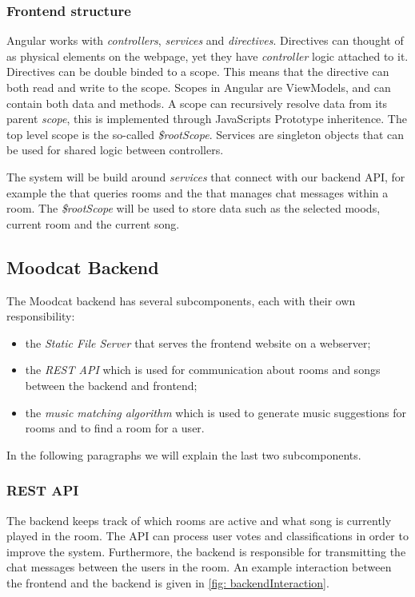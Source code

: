 \label{frontendstructure}
\subsubsection{Frontend structure}
Angular works with \textit{controllers}, \textit{services} and \textit{directives}.
Directives can thought of as physical elements on the webpage, yet they have \textit{controller} logic attached to it.
Directives can be double binded to a scope. This means that the directive can both read and write to the scope.
Scopes in Angular are \glspl{ViewModel}, and can contain both data and methods.
A scope can recursively resolve data from its parent \textit{scope}, this is implemented through JavaScripts \gls{Prototype inheritence}.
The top level scope is the so-called \textit{\$rootScope}.
Services are singleton objects that can be used for shared logic between controllers.

\par
The system will be build around \textit{services} that connect with our backend API, for example the  that queries rooms and the  that manages chat messages within a room.
The \textit{\$rootScope} will be used to store data such as the selected moods, current room and the current song.

\subsection{Moodcat Backend}
The Moodcat backend has several subcomponents, each with their own responsibility:
\begin{itemize}
\item the \textit{Static File Server} that serves the frontend website on a webserver;
\item the \textit{REST API} which is used for communication about rooms and songs between the backend and frontend;
\item the \textit{music matching algorithm} which is used to generate music suggestions for rooms and to find a room for a user.
\end{itemize}
In the following paragraphs we will explain the last two subcomponents.

\subsubsection{REST API}
The backend keeps track of which rooms are active and what song is currently played in the room.
The API can process user votes and classifications in order to improve the system.
Furthermore, the backend is responsible for transmitting the chat messages between the users in the room.
An example interaction between the frontend and the backend is given in \ref{fig: backendInteraction}.

